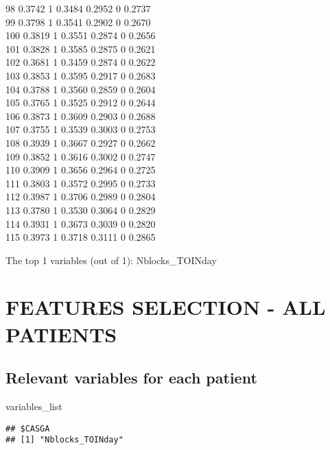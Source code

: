 \documentclass[
]{article}
\newenvironment{Shaded}{\begin{snugshade}}{\end{snugshade}}
\newcommand{\NormalTok}[1]{#1}
\begin{document}
98 0.3742 1 0.3484 0.2952 0 0.2737\\
99 0.3798 1 0.3541 0.2902 0 0.2670\\
100 0.3819 1 0.3551 0.2874 0 0.2656\\
101 0.3828 1 0.3585 0.2875 0 0.2621\\
102 0.3681 1 0.3459 0.2874 0 0.2622\\
103 0.3853 1 0.3595 0.2917 0 0.2683\\
104 0.3788 1 0.3560 0.2859 0 0.2604\\
105 0.3765 1 0.3525 0.2912 0 0.2644\\
106 0.3873 1 0.3609 0.2903 0 0.2688\\
107 0.3755 1 0.3539 0.3003 0 0.2753\\
108 0.3939 1 0.3667 0.2927 0 0.2662\\
109 0.3852 1 0.3616 0.3002 0 0.2747\\
110 0.3909 1 0.3656 0.2964 0 0.2725\\
111 0.3803 1 0.3572 0.2995 0 0.2733\\
112 0.3987 1 0.3706 0.2989 0 0.2804\\
113 0.3780 1 0.3530 0.3064 0 0.2829\\
114 0.3931 1 0.3673 0.3039 0 0.2820\\
115 0.3973 1 0.3718 0.3111 0 0.2865

The top 1 variables (out of 1): Nblocks\_TOINday

\hypertarget{features-selection---all-patients}{%
\section{FEATURES SELECTION - ALL
PATIENTS}\label{features-selection---all-patients}}

\hypertarget{relevant-variables-for-each-patient}{%
\subsection{Relevant variables for each
patient}\label{relevant-variables-for-each-patient}}

\begin{Shaded}
\begin{Highlighting}[]
\NormalTok{variables\_list}
\end{Highlighting}
\end{Shaded}

\begin{verbatim}
## $CASGA
## [1] "Nblocks_TOINday"
\end{verbatim}
\end{document}

